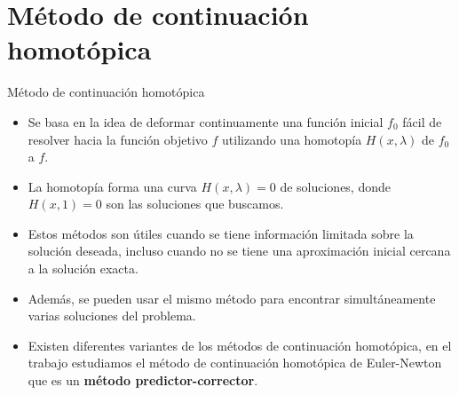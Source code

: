 \documentclass[a4paper,10pt]{beamer}
\begin{document}
\section{Método de continuación homotópica}
\begin{frame}{Método de continuación homotópica}

\begin{itemize}
	
	\item Se basa en la idea de deformar continuamente una función inicial $f_0$ fácil de resolver hacia la función objetivo $f$ utilizando una homotopía $H(x,\lambda)$ de $f_0$ a $f$.
	\pause
	\item La homotopía forma una curva $H(x,\lambda)=0$ de soluciones, donde $H(x,1)=0$ son las soluciones que buscamos.
	\pause
	\item Estos métodos son útiles cuando se tiene información limitada sobre la solución deseada, incluso cuando no se tiene una aproximación inicial cercana a la solución exacta.
	\pause
	\item Además, se pueden usar el mismo método para encontrar simultáneamente varias soluciones del problema.
	\pause
	\item Existen diferentes variantes de los métodos de continuación homotópica, en el trabajo estudiamos el método de continuación homotópica de Euler-Newton que es un \textbf{método predictor-corrector}.
\end{itemize}

\end{frame}
\end{document}
